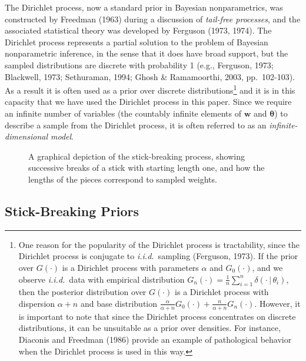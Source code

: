 \documentclass[authoryear]{elsarticle}
\newcommand{\condon}{\,|\,}
\newcommand{\vctr}[1]{\bm{#1}}
\newcommand{\efc}{\vspace*{15pt}}
\begin{document}
The Dirichlet process, now a standard prior in Bayesian nonparametrics, was
constructed by Freedman (1963) during a discussion of {\it tail-free processes},
and the associated statistical theory was developed by Ferguson (1973, 1974).
The Dirichlet process represents a partial solution to the problem of Bayesian
nonparametric inference, in the sense that it does have broad support, but the
sampled distributions are discrete with probability 1 (e.g., Ferguson, 1973;
Blackwell, 1973; Sethuraman, 1994; Ghosh \& Ramamoorthi, 2003, pp.~102-103).
As a result it is often used as a prior over discrete distributions\footnote{One
reason for the popularity of the Dirichlet process is tractability, since
the Dirichlet process is conjugate to {\it i.i.d.}\ sampling
(Ferguson, 1973). If the prior over $G(\cdot)$ is a Dirichlet process with
parameters $\alpha$ and $G_0(\cdot)$, and we observe {\it i.i.d.}\ data with
empirical distribution $G_n(\cdot)=\frac{1}{n} \sum_{i=1}^n
\delta(\cdot \condon \theta_i)$, then the posterior distribution over $G(\cdot)$ is a
Dirichlet process with dispersion $\alpha + n$ and base distribution
$\frac{\alpha}{\alpha+n}G_0(\cdot) + \frac{n}{\alpha+n} G_n(\cdot)$.
However, it is important to note that since
the Dirichlet process concentrates on discrete distributions, it can be unsuitable
as a prior over densities. For instance, Diaconis and Freedman (1986) provide an
example of pathological behavior when the Dirichlet process is used in this way.}
and it is in this capacity that we have used the Dirichlet process in this paper.
Since we require an infinite number of variables (the countably infinite elements
of $\vctr{w}$ and $\vctr{\theta}$) to describe a sample from the Dirichlet
process, it is often referred to as an {\it infinite-dimensional model}.

\begin{figure}[t]
        \begin{center}
        \caption{A graphical depiction of the stick-breaking process, showing
        successive breaks of a stick with starting length one, and how the lengths
        of the pieces correspond to sampled weights.\efc}
        \label{stickbreaking}
        \end{center}
\end{figure}

\subsection{Stick-Breaking Priors}
\end{document}
